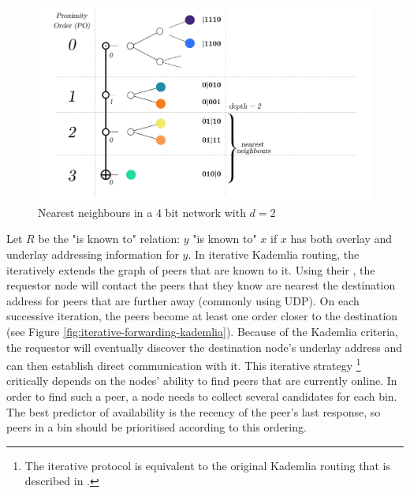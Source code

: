 \begin{figure}[htbp]
   \centering
    \includegraphics[width=\textwidth]{fig/kademlia-3.pdf}
   \caption[Nearest neighbours \statusgreen]{Nearest neighbours in a 4 bit network with $d = 2$ }
   \label{fig:bin-density}
\end{figure}

Let $R$ be the "is known to" relation:  $y$ "is known to" $x$ if $x$ has both overlay and underlay addressing information for $y$. 
In iterative Kademlia routing, the  iteratively extends the graph of peers that are known to it. Using their , the requestor node will contact the peers that they know are nearest the destination address for peers that are further away (commonly using UDP). On each successive iteration, the peers become at least one order closer to the destination (see Figure \ref{fig:iterative-forwarding-kademlia}). Because of the Kademlia criteria, the requestor will eventually discover the destination node's underlay address and can then establish direct communication with it. This iterative strategy%
%
\footnote{The iterative protocol is equivalent to the original Kademlia routing that is described in \cite{maymounkov2002kademlia}.
}
%
critically depends on the nodes' ability to find peers that are currently online. In order to find such a peer, a node needs to collect several candidates for each bin. The best predictor of availability is the recency of the peer's last response, so peers in a bin should be prioritised according to this ordering.

